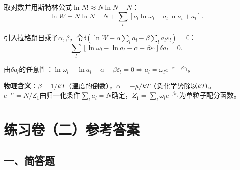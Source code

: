 \documentclass[12pt,a4paper,fontset=mac]{ctexart}
\newcommand{\đ}{\mathrm{đ}}
\begin{document}
\begin{enumerate}
取对数并用斯特林公式$\ln N!\approx N\ln N-N$：
\[\ln W=N\ln N-N+\sum_l[a_l\ln\omega_l-a_l\ln a_l+a_l].\]

引入拉格朗日乘子$\alpha,\beta$，令$\delta(\ln W-\alpha\sum_la_l-\beta\sum_la_l\varepsilon_l)=0$：
\[\sum_l[\ln\omega_l-\ln a_l-\alpha-\beta\varepsilon_l]\delta a_l=0.\]

由$\delta a_l$的任意性：$\ln\omega_l-\ln a_l-\alpha-\beta\varepsilon_l=0\Rightarrow a_l=\omega_l e^{-\alpha-\beta\varepsilon_l}$。

\textbf{物理含义}：$\beta=1/kT$（温度的倒数），$\alpha=-\mu/kT$（负化学势除以$kT$）。$e^{-\alpha}=N/Z_1$由归一化条件$\sum_l a_l=N$确定，$Z_1=\sum_l\omega_l e^{-\beta\varepsilon_l}$为单粒子配分函数。

\end{enumerate}

\newpage

\section*{练习卷（二）参考答案}

\subsection*{一、简答题}
\end{document}
